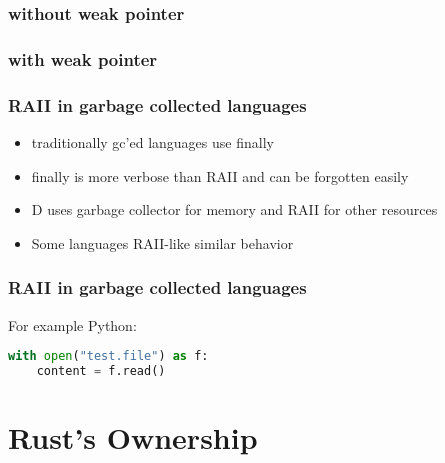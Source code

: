 \documentclass[xcolor=colortbl
]{beamer}
\begin{document}
\begin{frame}
    \frametitle{without weak pointer}
\end{frame}


\begin{frame}
    \frametitle{with weak pointer}
\end{frame}

\begin{frame}
    \frametitle{RAII in garbage collected languages}
    \begin{itemize}
        \item traditionally gc'ed languages use finally
        \item finally is more verbose than RAII and can be forgotten easily
        \item D uses garbage collector for memory and RAII for other resources
        \item Some languages RAII-like similar behavior
    \end{itemize}
\end{frame}


\begin{frame}[fragile]
    \frametitle{RAII in garbage collected languages}
    For example Python:
    \begin{lstlisting}[language=python,frame=single]
with open("test.file") as f:
    content = f.read()
    \end{lstlisting}
\end{frame}

\section{Rust's Ownership}
\end{document}
